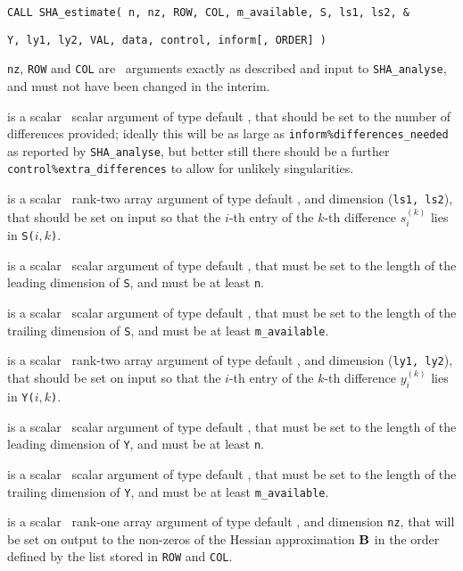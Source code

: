 \documentclass{galahad}
\newcommand{\packagename}{SHA}
\begin{document}
\hspace{8mm}
{\tt CALL \packagename\_estimate( n, nz, ROW, COL, m\_available, S, ls1, ls2, \&}
\vspace*{-1mm}

\hspace{42mm}
{\tt Y, ly1, ly2, VAL, data, control, inform[, ORDER] )}

\vspace*{-2mm}
\begin{description}
 {\tt nz}, {\tt ROW} and {\tt COL} are  \intentin\ arguments 
exactly as described and input to {\tt \packagename\_analyse},
and must not have been changed in the interim.

is a scalar \intentin\ scalar argument of type default \integer, that should 
be set to the number of differences provided; ideally this will
be as large as {\tt inform\%differences\_needed} as reported by
{\tt \packagename\_\-analyse}, but better still there should be a 
further {\tt control\%extra\_differences} to allow for unlikely singularities.

 is a scalar \intentin\ rank-two array argument of type 
default \realdp, and dimension ({\tt ls1, ls2}), that should be set on input
so that the $i$-th entry of the $k$-th difference $s_i^{(k)}$ lies in
{\tt S(}$i, k${\tt )}.  

is a scalar \intentin\ scalar argument of type default \integer, that must be
set to the length of the leading dimension of {\tt S}, and must be at least
{\tt n}. 

is a scalar \intentin\ scalar argument of type default \integer, that must be
set to the length of the trailing dimension of {\tt S}, and must be at least
{\tt m\_available}. 

 is a scalar \intentin\ rank-two array argument of type 
default \realdp, and dimension ({\tt ly1, ly2}), that should be set on input
so that the $i$-th entry of the $k$-th difference $y_i^{(k)}$ lies in
{\tt Y(}$i, k${\tt )}.  

is a scalar \intentin\ scalar argument of type default \integer, that must be
set to the length of the leading dimension of {\tt Y}, and must be at least
{\tt n}. 

is a scalar \intentin\ scalar argument of type default \integer, that must be
set to the length of the trailing dimension of {\tt Y}, and must be at least
{\tt m\_available}. 

 is a scalar \intentout\ rank-one array argument of type 
default \realdp, and dimension {\tt nz}, that will be set on output
to the non-zeros of the Hessian approximation ${\mathbf{B}}$ in the
order defined by the list stored in {\tt ROW} and {\tt COL}.


\end{description}
\end{document}
